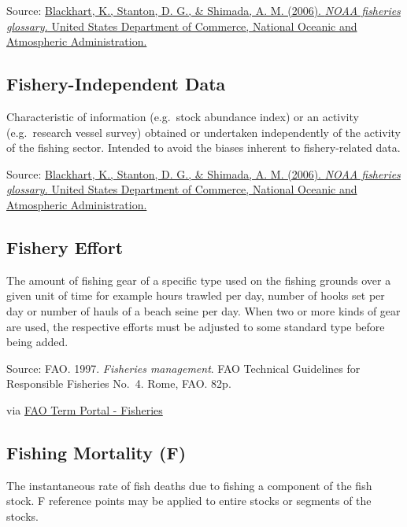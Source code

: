 \documentclass[
  11pt,
]{book}
\begin{document}
Source: \href{https://repository.library.noaa.gov/view/noaa/12856}{Blackhart, K., Stanton, D. G., \& Shimada, A. M. (2006). \emph{NOAA fisheries glossary.} United States Department of Commerce, National Oceanic and Atmospheric Administration.}

\hypertarget{fishery-independent-data}{%
\subsection{Fishery-Independent Data}\label{fishery-independent-data}}

Characteristic of information (e.g.~stock abundance index) or an activity (e.g.~research vessel survey) obtained or undertaken independently of the activity of the ﬁshing sector. Intended to avoid the biases inherent to ﬁshery-related data.

Source: \href{https://repository.library.noaa.gov/view/noaa/12856}{Blackhart, K., Stanton, D. G., \& Shimada, A. M. (2006). \emph{NOAA fisheries glossary.} United States Department of Commerce, National Oceanic and Atmospheric Administration.}

\hypertarget{fishery-effort}{%
\subsection{Fishery Effort}\label{fishery-effort}}

The amount of fishing gear of a specific type used on the fishing grounds over a given unit of time for example hours trawled per day, number of hooks set per day or number of hauls of a beach seine per day. When two or more kinds of gear are used, the respective efforts must be adjusted to some standard type before being added.

Source: FAO. 1997. \emph{Fisheries management}. FAO Technical Guidelines for Responsible Fisheries No.~4. Rome, FAO. 82p.

via \href{http://www.fao.org/fishery/glossary/en}{FAO Term Portal - Fisheries}

\hypertarget{fishing-mortality-f}{%
\subsection{Fishing Mortality (F)}\label{fishing-mortality-f}}

The instantaneous rate of fish deaths due to fishing a component of the fish stock. F reference points may be applied to entire stocks or segments of the stocks.
\end{document}
